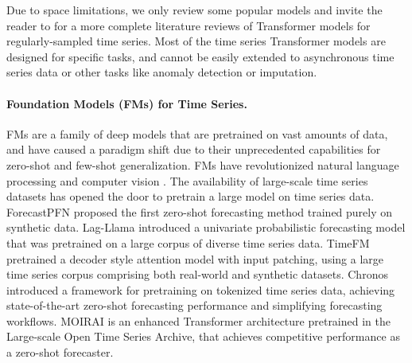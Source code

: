 Due to space limitations, we only review some popular models and invite the reader to \citep{Wen2023Transformers, Zeng2023Transformers} for a more complete literature reviews of Transformer models for regularly-sampled time series.
Most of the time series Transformer models are designed for specific tasks, and cannot be easily extended to asynchronous time series data or other tasks like anomaly detection or imputation.



\paragraph{Foundation Models (FMs) for Time Series.}
FMs \citep{Bommasani2021Opportunities} are a family of deep models that are pretrained on vast amounts of data, and have caused a paradigm shift due to their unprecedented capabilities for zero-shot and few-shot generalization.
FMs have revolutionized natural language processing \citep{Brown2020Language, BigScience2023Bloom, Wu2024Empirical, Dubey2024Llama3} and computer vision \citep{Radford2021Learning, Kirillov2023Segment}.
The availability of large-scale time series datasets has opened the door to pretrain a large model on time series data.
ForecastPFN \citep{Dooley2024ForecastPFN} proposed the first zero-shot forecasting method trained purely on synthetic data.
Lag-Llama \citep{Rasul2023LagLlama} introduced a univariate probabilistic forecasting model that was pretrained on a large corpus of diverse time series data.
TimeFM \citep{Das2024TimesFM} pretrained a decoder style attention model with input patching, using a large time series corpus comprising both real-world and synthetic
datasets. Chronos \citep{ansari2024chronos} introduced a framework for pretraining on tokenized time series data, achieving state-of-the-art zero-shot forecasting performance and simplifying forecasting workflows.
MOIRAI \citep{Woo2024Unified} is an enhanced Transformer architecture pretrained in the Large-scale Open Time Series Archive, that achieves competitive performance as a zero-shot forecaster.
